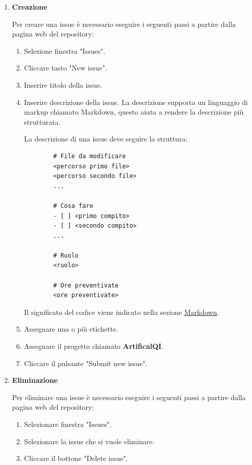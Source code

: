 \begin{enumerate}
    \item \textbf{Creazione}
    \label{item:creazione_issue}
    
    Per creare una issue è necessario eseguire i seguenti passi a partire dalla pagina web del repository:
    \begin{enumerate}
        \item Selezione finestra "Issues".
        \item Cliccare tasto "New issue".
        \item Inserire titolo della issue.
        \item Inserire descrizione della issue.
        La descrizione supporta un linguaggio di markup chiamato Markdown, questo aiuta a rendere la descrizione più strutturata.

        La descrizione di una issue deve seguire la struttura:
        \begin{lstlisting}
        # File da modificare
        <percorso primo file>
        <percorso secondo file>
        ...

        # Cosa fare
        - [ ] <primo compito>
        - [ ] <secondo compito>
        ...

        # Ruolo
        <ruolo>

        # Ore preventivate
        <ore preventivate>
        \end{lstlisting}
        Il significato del codice viene indicato nella sezione \hyperref[subpar:markdown]{Markdown}.

        \item Assegnare una o più etichette.
        \item Assegnare il progetto chiamato \textbf{ArtificalQI}.
        \item Cliccare il pulsante "Submit new issue".
    \end{enumerate}
    
    \item \textbf{Eliminazione}
    
    Per eliminare una issue è necessario eseguire i seguenti passi a partire dalla pagina web del repository:
    \begin{enumerate}
        \item Selezionare finestra "Issues".
        \item Selezionare la issue che si vuole eliminare.
        \item Cliccare il bottone "Delete issue".
    \end{enumerate}


\end{enumerate}
